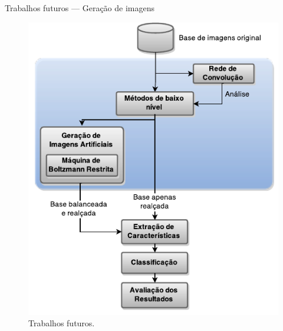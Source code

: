 \documentclass[10pt]{beamer}
\begin{document}
\begin{frame}{Trabalhos futuros --- Geração de imagens}
  \begin{figure}
    \includegraphics[height=0.75\textheight]{figuras/geral.pdf}
    \caption{Trabalhos futuros.}
  \end{figure}
\end{frame}
\end{document}
